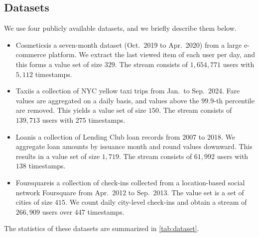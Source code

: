
\subsection{Datasets}

We use four publicly available datasets, and we briefly describe them below.
\begin{itemize}
    \item Cosmetics\footnotemark[1] is a seven-month dataset (Oct.~2019 to Apr.~2020) from a large e-commerce platform. We extract the last viewed item of each user per day, and this forms a value set of size $329$. The stream consists of $1,654,771$ users with $5,112$ timestamps.
    
    \item Taxi\footnotemark[2] is a collection of NYC yellow taxi trips from Jan.~to Sep.~2024.
    Fare values are aggregated on a daily basis, and values above the $99.9$-th percentile are removed. This yields a value set of size $150$.
    The stream consists of $139,713$ users with $275$ timestamps.
    
    \item Loan\footnotemark[3] is a collection of Lending Club loan records from
    2007 to 2018.
    We aggregate loan amounts by issuance month and round values downward.
    This results in a value set of size $1,719$.
    The stream consists of $61,992$ users with $138$ timestamps.
    
    \item Foursquare\footnotemark[4] is a collection of check-ins collected from
    a location-based social network Foursquare from Apr.~2012 to Sep.~2013.
    The value set is a set of cities of size $415$.
    We count daily city-level check-ins and obtain a stream of $266,909$ users over
    $447$ timestamps.
\end{itemize}
The statistics of these datasets are summarized in \cref{tab:dataset}.




